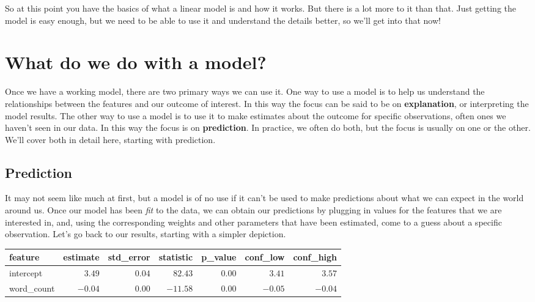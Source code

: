 \documentclass[
  letterpaper,
]{krantz}
\begin{document}
So at this point you have the basics of what a linear model is and how
it works. But there is a lot more to it than that. Just getting the
model is easy enough, but we need to be able to use it and understand
the details better, so we'll get into that now!

\section{What do we do with a model?}\label{what-do-we-do-with-a-model}

Once we have a working model, there are two primary ways we can use it.
One way to use a model is to help us understand the relationships
between the features and our outcome of interest. In this way the focus
can be said to be on \textbf{explanation}, or interpreting the model
results. The other way to use a model is to use it to make estimates
about the outcome for specific observations, often ones we haven't seen
in our data. In this way the focus is on \textbf{prediction}. In
practice, we often do both, but the focus is usually on one or the
other. We'll cover both in detail here, starting with prediction.

\subsection{Prediction}\label{prediction}

It may not seem like much at first, but a model is of no use if it can't
be used to make predictions about what we can expect in the world around
us. Once our model has been \emph{fit} to the data, we can obtain our
predictions by plugging in values for the features that we are
interested in, and, using the corresponding weights and other parameters
that have been estimated, come to a guess about a specific observation.
Let's go back to our results, starting with a simpler depiction.

\begin{longtable*}{lrrrrrr}
\toprule
feature & estimate & std\_error & statistic & p\_value & conf\_low & conf\_high \\ 
\midrule\addlinespace[2.5pt]
intercept & \textcolor[HTML]{404040}{$3.49$} & \textcolor[HTML]{404040}{$0.04$} & \textcolor[HTML]{404040}{$82.43$} & \textcolor[HTML]{404040}{$0.00$} & \textcolor[HTML]{404040}{$3.41$} & \textcolor[HTML]{404040}{$3.57$} \\ 
word\_count & \textcolor[HTML]{404040}{$-0.04$} & \textcolor[HTML]{404040}{$0.00$} & \textcolor[HTML]{404040}{$-11.58$} & \textcolor[HTML]{404040}{$0.00$} & \textcolor[HTML]{404040}{$-0.05$} & \textcolor[HTML]{404040}{$-0.04$} \\ 
\bottomrule
\end{longtable*}
\end{document}
